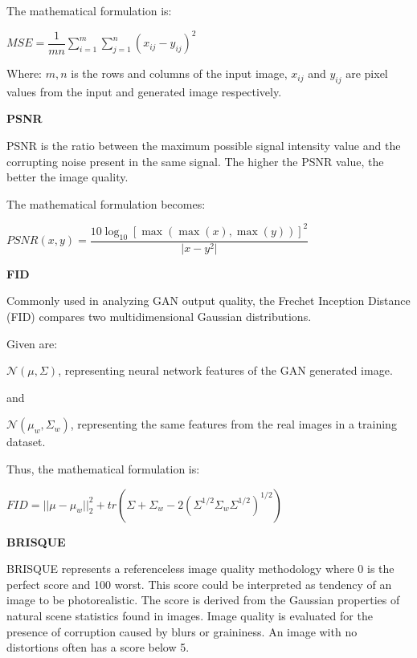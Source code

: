 The mathematical formulation is:

\vspace{3mm}

\begin{center}
$MSE=\dfrac{1}{mn} \sum_{i=1}^m \sum_{j=1}^n (x_{ij}-y_{ij})^2 $
\end{center}


Where:
$m,n$ is the rows and columns of the input image,
$x_{ij}$ and $y_{ij}$ are pixel values from the input and generated image respectively. \citep{Metrics}


\vspace{6mm}

\textbf{PSNR}


PSNR is the ratio between the maximum possible signal intensity value and the corrupting noise present in the same signal. 
The higher the PSNR value, the better the image quality. \citep{Metrics}


The mathematical formulation becomes:
\vspace{3mm}

\begin{center}
$PSNR(x,y)=\dfrac{10\log_{10}[\max(\max(x),\max(y))]^2}{\vert{x-y}^2\vert}$
\end{center}

\newpage

\textbf{FID}


Commonly used in analyzing GAN output quality, the Frechet Inception Distance (FID) compares two multidimensional Gaussian distributions. 

Given are:


$\mathcal{N}(\mu ,\Sigma )$, representing neural network features of the GAN generated image.

and 

$\mathcal{N}(\mu_w,\Sigma_w)$, representing the same features from the real images in a training dataset. 
\citep{FID}

\vspace{3mm}

Thus, the mathematical formulation is:


\begin{center}
$FID=||\mu -\mu _{w}||_{2}^{2} + tr(\Sigma +\Sigma _{w}-2(\Sigma ^{1/2}\Sigma _{w}\Sigma ^{1/2})^{1/2})$
\end{center}

\vspace{5mm}

\textbf{BRISQUE}


BRISQUE represents a referenceless image quality methodology where 0 is the perfect score and 100 worst.
This score could be interpreted as tendency of an image to be photorealistic. The score is derived from
the Gaussian properties of natural scene statistics found in images.
Image quality is evaluated for the presence of corruption caused by blurs or graininess. 
An image with no distortions often has a score below 5. \citep{BRISQUE}

\vspace{3mm}

